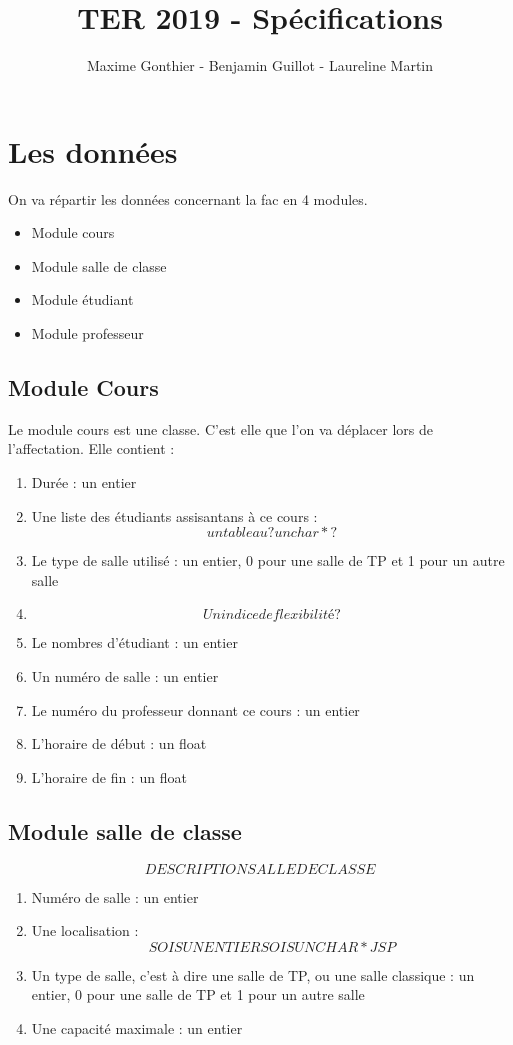 \documentclass[a4paper,11pt]{article}
\title{TER 2019 - Spécifications}
\author{Maxime Gonthier - Benjamin Guillot - Laureline Martin}
\begin{document}
	\clearpage
	\maketitle

\newpage
\tableofcontents

\newpage
\section{Les données}
	On va répartir les données concernant la fac en 4 modules.\\
	\begin{itemize}
		\item Module cours
		\item Module salle de classe
		\item Module étudiant
		\item Module professeur
	\end{itemize}
	\subsection{Module Cours}
		Le module cours est une classe. C'est elle que l'on va déplacer lors de l'affectation. Elle contient : 
		\begin{enumerate}
			\item Durée : un entier
			\item Une liste des étudiants assisantans à ce cours : $$un tableau ? un char* ?$$
			\item Le type de salle utilisé : un entier, 0 pour une salle de TP et 1 pour un autre salle
			\item $$Un indice de flexibilité ?$$
			\item Le nombres d'étudiant : un entier
			\item Un numéro de salle : un entier
			\item Le numéro du professeur donnant ce cours : un entier
			\item L'horaire de début : un float
			\item L'horaire de fin : un float
		\end{enumerate}
	\subsection{Module salle de classe}
		$$DESCRIPTION SALLE DE CLASSE$$
		\begin{enumerate}
			\item Numéro de salle : un entier
			\item Une localisation : $$SOIS UN ENTIER SOIS UN CHAR* JSP$$
			\item Un type de salle, c'est à dire une salle de TP, ou une salle classique : un entier, 0 pour une salle de TP et 1 pour un autre salle
			\item Une capacité maximale : un entier
		\end{enumerate}
\end{document}
